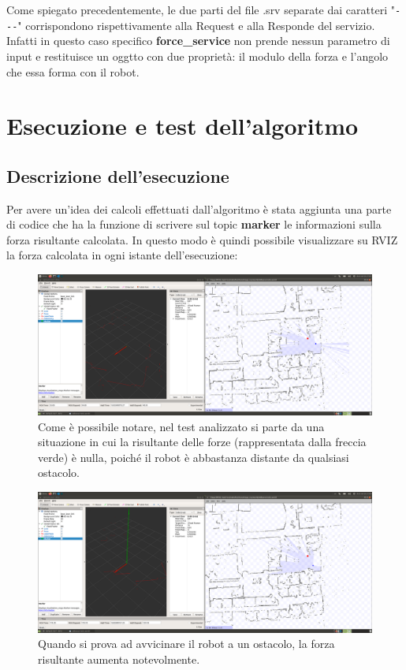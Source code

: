 \documentclass[Lau, binding=0.6cm, oneside]{sapthesis}
\begin{document}
Come spiegato precedentemente, le due parti del file .srv separate dai caratteri "\lstinline{---}" corrispondono rispettivamente alla Request e alla Responde del servizio.
Infatti in questo caso specifico \textbf{force\_service} non prende nessun parametro di input e restituisce un oggtto con due proprietà: il modulo della forza e l'angolo che essa forma con il robot.

\chapter{Esecuzione e test dell'algoritmo}
\section{Descrizione dell'esecuzione}
Per avere un'idea dei calcoli effettuati dall'algoritmo è stata aggiunta una parte di codice che ha la funzione di scrivere sul topic \textbf{marker} le informazioni sulla forza risultante calcolata.
In questo modo è quindi possibile visualizzare su RVIZ la forza calcolata in ogni istante dell'esecuzione:
\begin{figure}[htp]
    \centering
    \includegraphics[width=13.5cm]{rviz_force1.png}
    \caption{Come è possibile notare, nel test analizzato si parte da una situazione in cui la risultante delle forze (rappresentata dalla freccia verde) è nulla, poiché il robot è abbastanza distante da qualsiasi ostacolo.}
    \label{fig:rviz_force1}
\end{figure}
\begin{figure}[htp]
    \centering
    \includegraphics[width=13.5cm]{rviz_force2.png}
    \caption{Quando si prova ad avvicinare il robot a un ostacolo, la forza risultante aumenta notevolmente.}
    \label{fig:rviz_force2}
\end{figure}
\end{document}
